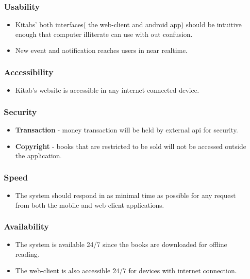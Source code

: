 	\subsubsection{Usability}
	\begin{itemize}
		\item Kitabs' both interfaces( the web-client and android app) should be intuitive enough that computer illiterate can use with out confusion.
		\item New event and notification reaches users in near realtime.
	\end{itemize}

	\subsubsection{Accessibility}
	\begin{itemize}
		\item Kitab's website is accessible in any internet connected device.
	\end{itemize}

	\subsubsection{Security}
	\begin{itemize}
		\item \textbf{Transaction} - money transaction will be held by external api for security.
		\item \textbf{Copyright} - books that are restricted to be sold will not be accessed outside the application.
	\end{itemize}

	\subsubsection{Speed}
	\begin{itemize}
		\item The system should respond in as minimal time as possible for any request from both the mobile and web-client applications.
	\end{itemize}

	\subsubsection{Availability}
	\begin{itemize}
		\item The system is available 24/7 since the books are downloaded for offline reading.
		\item The web-client is also accessible 24/7 for devices with internet connection.
	\end{itemize}

